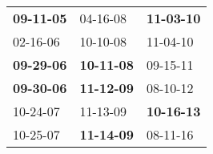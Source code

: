 \begin{supertabular}{p{0.33\columnwidth}p{0.33\columnwidth}p{0.33\columnwidth}}
 \textbf{09-11-05\textsuperscript{}} &           04-16-08\textsuperscript{} &  \textbf{11-03-10\textsuperscript{}} \\
          02-16-06\textsuperscript{} &           10-10-08\textsuperscript{} &           11-04-10\textsuperscript{} \\
 \textbf{09-29-06\textsuperscript{}} &  \textbf{10-11-08\textsuperscript{}} &           09-15-11\textsuperscript{} \\
 \textbf{09-30-06\textsuperscript{}} &  \textbf{11-12-09\textsuperscript{}} &           08-10-12\textsuperscript{} \\
          10-24-07\textsuperscript{} &           11-13-09\textsuperscript{} &  \textbf{10-16-13\textsuperscript{}} \\
          10-25-07\textsuperscript{} &  \textbf{11-14-09\textsuperscript{}} &           08-11-16\textsuperscript{} \\
\end{supertabular}
